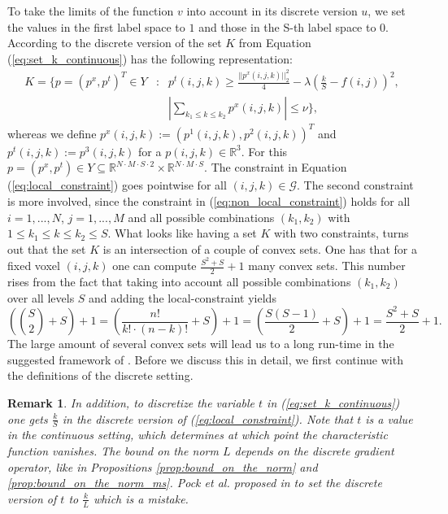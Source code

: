 \documentclass[abstracton]{scrreprt}
\newtheorem{remark}[theorem]{Remark}
\begin{document}
        To take the limits of the function $v$ into account in its discrete version $u$, we set the values in the first label space to $1$ and those in the S-th label space to $0$. According to \cite{Pock-et-al-iccv09} the discrete version of the set $K$ from Equation (\ref{eq:set_k_continuous}) has the following representation:
            \begin{eqnarray}
                K = \{ p = (p^{x}, p^{t})^{T} \in Y &:& p^{t}(i,j,k) \ge \frac{||p^{x}(i,j,k)||_{2}^{2}}{4} - \lambda(\frac{k}{S} - f(i,j))^{2}, \label{eq:local_constraint} \\
                &&\left| \sum_{k_{1} \le k \le k_{2}} p^{x}(i,j,k) \right| \le \nu \}, \label{eq:non_local_constraint}
            \end{eqnarray}
        whereas we define $p^{x}(i,j,k) := (p^{1}(i,j,k), p^{2}(i,j,k))^{T}$ and $p^{t}(i,j,k) := p^{3}(i,j,k)$ for a $p(i,j,k) \in \mathbb{R}^{3}$. For this $p = (p^{x}, p^{t}) \in Y \subseteq \mathbb{R}^{N \cdot M \cdot S \cdot 2} \times \mathbb{R}^{N \cdot M \cdot S}$. The constraint in Equation (\ref{eq:local_constraint}) goes pointwise for all $(i, j, k) \in \mathcal{G}$. The second constraint is more involved, since the constraint in (\ref{eq:non_local_constraint}) holds for all $i = 1, ..., N$, $j = 1, ..., M$ and all possible combinations $(k_{1}, k_{2})$ with $1 \le k_{1} \le k \le k_{2} \le S$. What looks like having a set $K$ with two constraints, turns out that the set $K$ is an intersection of a couple of convex sets. One has that for a fixed voxel $(i, j, k)$ one can compute $\frac{S^{2} + S}{2} + 1$ many convex sets. This number rises from the fact that taking into account all possible combinations $(k_{1}, k_{2})$ over all levels $S$ and adding the local-constraint yields
            $$
                \left(\binom{S}{2} + S\right) + 1 = \left(\frac{n!}{k! \cdot (n-k)!} + S\right) + 1 = \left(\frac{S(S-1)}{2} + S\right) + 1 = \frac{S^{2} + S}{2} + 1.
            $$
        The large amount of several convex sets will lead us to a long run-time in the suggested framework of \cite{Pock-et-al-iccv09}. Before we discuss this in detail, we first continue with the definitions of the discrete setting.
        \begin{remark}
            In addition, to discretize the variable $t$ in (\ref{eq:set_k_continuous}) one gets $\frac{k}{S}$ in the discrete version of (\ref{eq:local_constraint}). Note that $t$ is a value in the continuous setting, which determines at which point the characteristic function vanishes. The bound on the norm $L$ depends on the discrete gradient operator, like in Propositions \ref{prop:bound_on_the_norm} and \ref{prop:bound_on_the_norm_ms}. Pock et al. proposed in \cite{Pock-et-al-iccv09} to set the discrete version of $t$ to $\frac{k}{L}$ which is a mistake.
        \end{remark}
\end{document}
